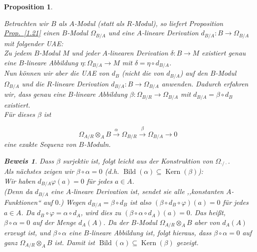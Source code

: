\documentclass[a4paper,12pt]{scrbook}
\theoremstyle{break}
\newtheorem{Prop}[Def]{Proposition}
\theoremstyle{nonumberbreak}
\newtheorem{Bew}{Beweis}
\theoremstyle{nonumberplain}
\newcommand{\myref}[2]{%
\hyperref[#2]{#1~\ref*{#2}}%
}
\DeclareMathOperator{\Kern}{Kern}
\DeclareMathOperator{\Bild}{Bild}
\begin{document}
\begin{Prop}
\begin{enumerate}
Betrachten wir $B$ als $A$-Modul (statt als $R$-Modul), so liefert Proposition \myref{Prop.}{1.21} einen $B$-Modul
$\Omega_{B/A}$ und eine $A$-lineare Derivation $d_{B/A} : B \to \Omega_{B/A}$ mit folgender UAE: \\
  Zu jedem $B$-Modul $M$ und jeder $A$-linearen Derivation $\delta: B \to M$
  existiert genau eine $B$-lineare Abbildung $\eta: \Omega_{B/A} \to M$ mit
  $\delta = \eta \circ d_{B/A}$. \\
Nun können wir aber die UAE von $d_B$ (nicht die von $d_{B/A}$) auf den
$B$-Modul $\Omega_{B/A}$ und die $R$-lineare Derivation $d_{B/A} : B \to \Omega_{B/A}$
anwenden. Dadurch erfahren wir, dass genau eine $B$-lineare Abbildung
$\beta : \Omega_{B/R} \to \Omega_{B/A} $ mit $d_{B/A} = \beta \circ d_{B}$ existiert. \\
Für dieses $\beta$ ist

$$\Omega_{A/R} \otimes_A B \overset{\alpha}{\rightarrow} \Omega_{B/R} \overset{\beta}{\rightarrow} \Omega_{B/A} \rightarrow 0$$
eine exakte Sequenz von $B$-Moduln.

\begin{Bew}
Dass $\beta$ surjektiv ist, folgt leicht aus der Konstruktion von $\Omega_{\cdot/\cdot}$.\\

Als nächstes zeigen wir $\beta \circ \alpha = 0$ (d.h. $\Bild(\alpha) \subseteq \Kern(\beta)$):\\
Wir haben $d_{B/A}\varphi(a) = 0$ für jedes $a \in A$. \\
(Denn da $d_{B/A}$ eine $A$-lineare Derivation ist, sendet sie alle
,,konstanten $A$-Funktionen`` auf $0$.)
Wegen $d_{B/A} = \beta \circ d_{B}$ ist also
$\left(\beta\circ d_B\circ \varphi\right) \left(a\right) = 0$
für jedes $a\in A$. Da $d_B \circ \varphi = \alpha \circ d_A$, wird dies zu
$\left(\beta \circ \alpha \circ d_A\right)\left(a\right) = 0$.
Das heißt, $\beta\circ \alpha=0$ auf der Menge $d_A\left(A\right)$. Da
der $B$-Modul $\Omega_{A/R} \otimes_A B$ aber von $d_A\left(A\right)$
erzeugt ist, und $\beta\circ \alpha$ eine $B$-lineare Abbildung ist, folgt
hieraus, dass $\beta\circ \alpha=0$ auf ganz $\Omega_{A/R} \otimes_A B$ ist.
Damit ist $\Bild(\alpha) \subseteq \Kern(\beta)$ gezeigt. \\


\end{Bew}
\end{enumerate}
\end{Prop}
\end{document}
